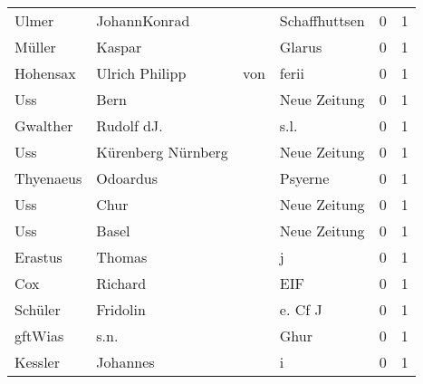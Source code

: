 \begin{tabular}{llllrr}
                    Ulmer &                       JohannKonrad &             &                               Schaffhuttsen &          0 &         1 \\
                   Müller &                             Kaspar &             &                                      Glarus &          0 &         1 \\
                 Hohensax &                     Ulrich Philipp &         von &                                       ferii &          0 &         1 \\
                      Uss &                               Bern &             &                                Neue Zeitung &          0 &         1 \\
                 Gwalther &                         Rudolf dJ. &             &                                        s.l. &          0 &         1 \\
                      Uss &                 Kürenberg Nürnberg &             &                                Neue Zeitung &          0 &         1 \\
                Thyenaeus &                           Odoardus &             &                                     Psyerne &          0 &         1 \\
                      Uss &                               Chur &             &                                Neue Zeitung &          0 &         1 \\
                      Uss &                              Basel &             &                                Neue Zeitung &          0 &         1 \\
                  Erastus &                             Thomas &             &                                           j &          0 &         1 \\
                      Cox &                            Richard &             &                                         EIF &          0 &         1 \\
                  Schüler &                           Fridolin &             &                                     e. Cf J &          0 &         1 \\
                  gftWias &                               s.n. &             &                                        Ghur &          0 &         1 \\
                  Kessler &                           Johannes &             &                                           i &          0 &         1 \\

\end{tabular}
